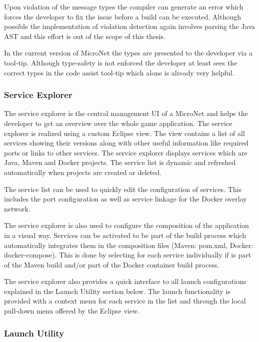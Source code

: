 Upon violation of the message types the compiler can generate an error which
forces the developer to fix the issue before a build can be executed.
Although possible the implementation of violation detection again involves
parsing the Java AST and this effort is out of the scope of this
thesis.

In the current version of MicroNet the types are presented to
the developer via a tool-tip. Although type-safety is not
enforced the developer at least sees the correct types in the
code assist tool-tip which alone is already very helpful.


\subsubsection{Service Explorer}

The service explorer is the central management UI of a MicroNet and helps the
developer to get an overview over the whole game application. The service
explorer is realized using a custom Eclipse view. The view contains a list of
all services showing their versions along with other useful information
like required ports or links to other services. The service explorer displays
services which are Java, Maven and Docker projects. The service list is dynamic
and refreshed automatically when projects are created or deleted.

The service list can be used to quickly edit the configuration of services. This
includes the port configuration as well as service linkage for the Docker
overlay network.

The service explorer is also used to configure the composition of the
application in a visual way. Services can be activated to be part of the build
process which automatically integrates them in the composition files (Maven:
pom.xml, Docker: docker-compose). This is done by selecting for each service
individually if is part of the Maven build and/or part of the Docker container
build process.

The service explorer also provides a quick interface to all launch
configurations explained in the Launch Utility section below. The launch
functionality is provided with a context menu for each service in the list and
through the local pull-down menu offered by the Eclipse view.


\subsubsection{Launch Utility}


